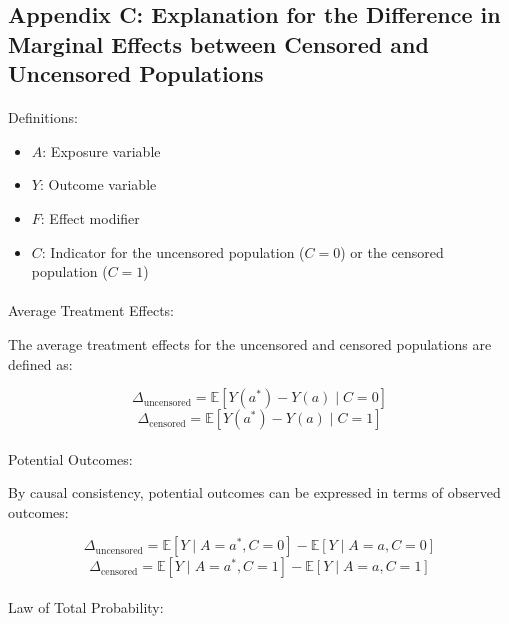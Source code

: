 \documentclass[
  single column]{article}
\makeatletter
\let\oldparagraph\paragraph
\renewcommand{\paragraph}{
    \@ifstar
      \xxxParagraphStar
      \xxxParagraphNoStar
  }
\newcommand{\xxxParagraphStar}[1]{\oldparagraph*{#1}\mbox{}}
\newcommand{\xxxParagraphNoStar}[1]{\oldparagraph{#1}\mbox{}}
\providecommand{\tightlist}{%
  \setlength{\itemsep}{0pt}\setlength{\parskip}{0pt}}\usepackage{longtable,booktabs,array}
\makeatother
\begin{document}
\newpage{}

\subsection{Appendix C: Explanation for the Difference in Marginal
Effects between Censored and Uncensored Populations}\label{id-app-c}

\paragraph{Definitions:}\label{definitions}

\begin{itemize}
\tightlist
\item
  \textbf{\(A\)}: Exposure variable
\item
  \textbf{\(Y\)}: Outcome variable
\item
  \textbf{\(F\)}: Effect modifier
\item
  \textbf{\(C\)}: Indicator for the uncensored population (\(C = 0\)) or
  the censored population (\(C = 1\))
\end{itemize}

\paragraph{Average Treatment Effects:}\label{average-treatment-effects}

The average treatment effects for the uncensored and censored
populations are defined as:

\[
\Delta_{\text{uncensored}} = \mathbb{E}[Y(a^*) - Y(a) \mid C = 0]
\] \[
\Delta_{\text{censored}} = \mathbb{E}[Y(a^*) - Y(a) \mid C = 1]
\]

\paragraph{Potential Outcomes:}\label{potential-outcomes}

By causal consistency, potential outcomes can be expressed in terms of
observed outcomes:

\[
\Delta_{\text{uncensored}} = \mathbb{E}[Y \mid A=a^*, C=0] - \mathbb{E}[Y \mid A=a, C=0]
\] \[
\Delta_{\text{censored}} = \mathbb{E}[Y \mid A=a^*, C=1] - \mathbb{E}[Y \mid A=a, C=1]
\]

\paragraph{Law of Total Probability:}\label{law-of-total-probability}
\end{document}
